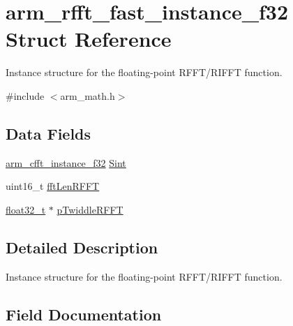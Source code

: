 \hypertarget{structarm__rfft__fast__instance__f32}{}\section{arm\+\_\+rfft\+\_\+fast\+\_\+instance\+\_\+f32 Struct Reference}
\label{structarm__rfft__fast__instance__f32}


Instance structure for the floating-\/point R\+F\+F\+T/\+R\+I\+F\+FT function.  




{\ttfamily \#include $<$arm\+\_\+math.\+h$>$}

\subsection*{Data Fields}
\begin{DoxyCompactItemize}
\item 
\mbox{\hyperlink{structarm__cfft__instance__f32}{arm\+\_\+cfft\+\_\+instance\+\_\+f32}} \mbox{\hyperlink{structarm__rfft__fast__instance__f32_aa8a05a9fabc3852e5d476152a5067e53}{Sint}}
\item 
uint16\+\_\+t \mbox{\hyperlink{structarm__rfft__fast__instance__f32_a174f8c72d545034e19ba4ced52b31353}{fft\+Len\+R\+F\+FT}}
\item 
\mbox{\hyperlink{arm__math_8h_a4611b605e45ab401f02cab15c5e38715}{float32\+\_\+t}} $\ast$ \mbox{\hyperlink{structarm__rfft__fast__instance__f32_a43370fe848d06993faf834da07ca91ce}{p\+Twiddle\+R\+F\+FT}}
\end{DoxyCompactItemize}


\subsection{Detailed Description}
Instance structure for the floating-\/point R\+F\+F\+T/\+R\+I\+F\+FT function. 

\subsection{Field Documentation}
\mbox{\label{structarm__rfft__fast__instance__f32_a174f8c72d545034e19ba4ced52b31353}} 
